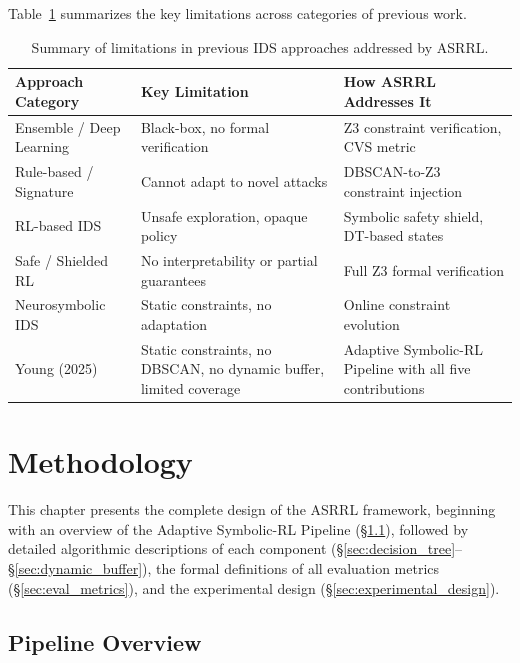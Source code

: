 \documentclass[12pt, letterpaper, oneside]{report}
\newcommand{\ASRRL}{\textsc{ASRRL}}
\begin{document}
Table~\ref{tab:prior_limitations} summarizes the key limitations across categories of previous work.

\begin{table}[htbp]
\centering
\caption{Summary of limitations in previous IDS approaches addressed by \ASRRL{}.}
\label{tab:prior_limitations}
\small
\begin{tabular}{p{3.5cm}p{4cm}p{4cm}}
\toprule
\textbf{Approach Category} & \textbf{Key Limitation} & \textbf{How \ASRRL{} Addresses It} \\
\midrule
Ensemble / Deep Learning & Black-box, no formal verification & Z3 constraint verification, CVS metric \\
Rule-based / Signature & Cannot adapt to novel attacks & DBSCAN-to-Z3 constraint injection \\
RL-based IDS & Unsafe exploration, opaque policy & Symbolic safety shield, DT-based states \\
Safe / Shielded RL & No interpretability or partial guarantees & Full Z3 formal verification \\
Neurosymbolic IDS & Static constraints, no adaptation & Online constraint evolution \\
Young (2025) & Static constraints, no DBSCAN, no dynamic buffer, limited coverage & Adaptive Symbolic-RL Pipeline with all five contributions \\
\bottomrule
\end{tabular}
\end{table}



\chapter{Methodology}
\label{ch:methodology}

This chapter presents the complete design of the \ASRRL{} framework, beginning with an overview of the Adaptive Symbolic-RL Pipeline (\S\ref{sec:pipeline_overview}), followed by detailed algorithmic descriptions of each component (\S\ref{sec:decision_tree}--\S\ref{sec:dynamic_buffer}), the formal definitions of all evaluation metrics (\S\ref{sec:eval_metrics}), and the experimental design (\S\ref{sec:experimental_design}).


\section{Pipeline Overview}
\label{sec:pipeline_overview}
\end{document}
